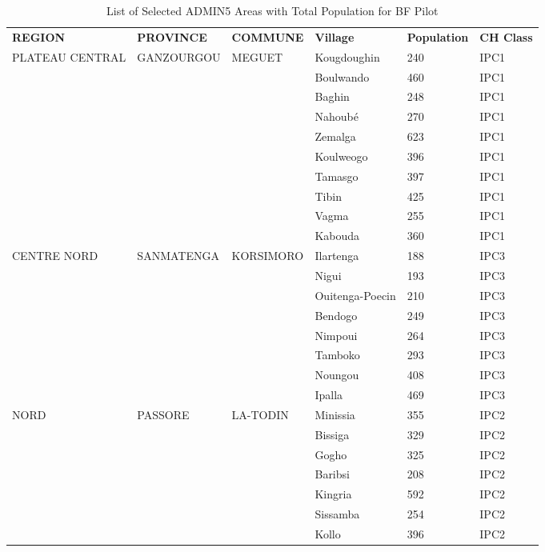 \begin{table}[!ht]
	\caption{List of Selected ADMIN5 Areas with Total Population for BF Pilot}
    \centering
    \begin{tabular}{llllll}
    \hline\hline
        \textbf{REGION} & \textbf{PROVINCE} & \textbf{COMMUNE} & \textbf{Village} & \textbf{Population} & \textbf{CH Class} \\ \cline{1-6}
        PLATEAU CENTRAL & GANZOURGOU & MEGUET & Kougdoughin & 240 & IPC1 \\ 
        ~ & ~ & ~ & Boulwando & 460 & IPC1 \\ 
        ~ & ~ & ~ & Baghin & 248 & IPC1 \\ 
        ~ & ~ & ~ & Nahoubé & 270 & IPC1 \\ 
        ~ & ~ & ~ & Zemalga & 623 & IPC1 \\ 
        ~ & ~ & ~ & Koulweogo & 396 & IPC1 \\ 
        ~ & ~ & ~ & Tamasgo & 397 & IPC1 \\ 
        ~ & ~ & ~ & Tibin & 425 & IPC1 \\ 
        ~ & ~ & ~ & Vagma & 255 & IPC1 \\ 
        ~ & ~ & ~ & Kabouda & 360 & IPC1 \\ 
        CENTRE NORD & SANMATENGA & KORSIMORO & Ilartenga & 188 & IPC3 \\ 
        ~ & ~ & ~ & Nigui & 193 & IPC3 \\ 
        ~ & ~ & ~ & Ouitenga-Poecin & 210 & IPC3 \\ 
        ~ & ~ & ~ & Bendogo & 249 & IPC3 \\ 
        ~ & ~ & ~ & Nimpoui & 264 & IPC3 \\ 
        ~ & ~ & ~ & Tamboko & 293 & IPC3 \\ 
        ~ & ~ & ~ & Noungou & 408 & IPC3 \\ 
        ~ & ~ & ~ & Ipalla & 469 & IPC3 \\ 
        NORD & PASSORE & LA-TODIN & Minissia & 355 & IPC2 \\ 
        ~ & ~ & ~ & Bissiga & 329 & IPC2 \\ 
        ~ & ~ & ~ & Gogho & 325 & IPC2 \\ 
        ~ & ~ & ~ & Baribsi & 208 & IPC2 \\ 
        ~ & ~ & ~ & Kingria & 592 & IPC2 \\ 
        ~ & ~ & ~ & Sissamba & 254 & IPC2 \\ 
        ~ & ~ & ~ & Kollo & 396 & IPC2 \\ 

\end{tabular}
\end{table}
